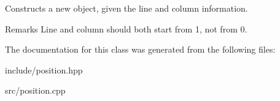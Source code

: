 Constructs a new object, given the line and column information. 

\begin{DoxyRemark}{Remarks}
Line and column should both start from 1, not from 0. 
\end{DoxyRemark}


The documentation for this class was generated from the following files\+:\begin{DoxyCompactItemize}
\item 
include/position.\+hpp\item 
src/position.\+cpp\end{DoxyCompactItemize}
